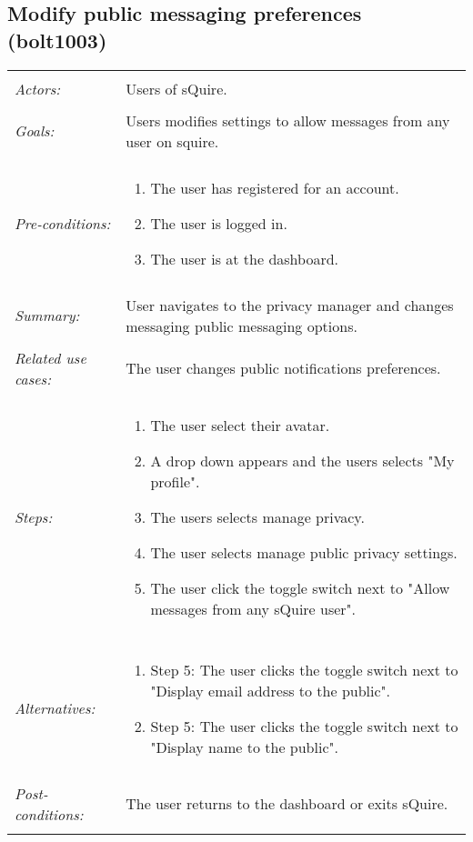 \documentclass[11pt]{report}
\begin{document}
\subsection{Modify public messaging preferences (bolt1003)}
\begin{tabular}{ p{2cm} p{12cm} }
 \hline
 \\
 \textit{Actors:} & Users of sQuire. \\ 
 \\
 \textit{Goals:} & Users modifies settings to allow messages from any user on squire. \\
 \\
 \textit{Pre-conditions:} & \begin{enumerate}
  \item The user has registered for an account.
  \item The user is logged in.
  \item The user is at the dashboard.
 \end{enumerate} \\
 \\
 \textit{Summary:} & User navigates to the privacy manager and changes messaging public messaging options.\\ 
 \\
 \textit{Related use cases:} & The user changes public notifications preferences. \\ 
 \\
 \textit{Steps:} & \begin{enumerate}
  \item The user select their avatar.
  \item A drop down appears and the users selects "My profile".
  \item The users selects manage privacy.
  \item The user selects manage public privacy settings.
  \item The user click the toggle switch next to "Allow messages from any sQuire user".
 \end{enumerate} \\
 \\
 \textit{Alternatives:} & \begin{enumerate} 
  \item Step 5: The user clicks the toggle switch next to "Display email address to the public".
  \item Step 5: The user clicks the toggle switch next to "Display name to the public".
 \end{enumerate} \\
 \\
 \textit{Post-conditions:} & The user returns to the dashboard or exits sQuire. \\
 \\
\hline
\end{tabular}
\end{document}
